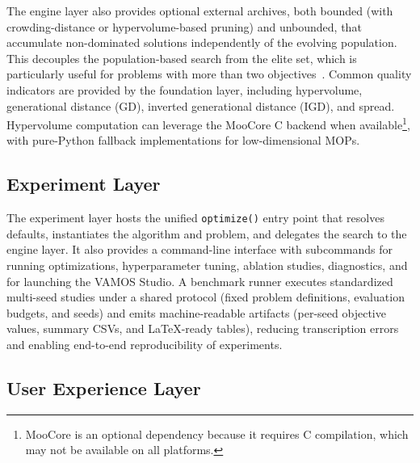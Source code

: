 \documentclass[journal]{IEEEtran}
\begin{document}
The engine layer also provides optional external archives, both bounded (with crowding-distance or hypervolume-based pruning) and unbounded, that accumulate non-dominated solutions independently of the evolving population. This decouples the population-based search from the elite set, which is particularly useful for problems with more than two objectives~\cite{IPS20}. Common quality indicators are provided by the foundation layer, including hypervolume, generational distance (GD), inverted generational distance (IGD), and spread. Hypervolume computation can leverage the MooCore C backend when available\footnote{MooCore is an optional dependency because it requires C compilation, which may not be available on all platforms.}, with pure-Python fallback implementations for low-dimensional MOPs.

\subsection{Experiment Layer}

The experiment layer hosts the unified \texttt{optimize()} entry point that resolves defaults, instantiates the algorithm and problem, and delegates the search to the engine layer. It also provides a command-line interface with subcommands for running optimizations, hyperparameter tuning, ablation studies, diagnostics, and for launching the VAMOS Studio. A benchmark runner executes standardized multi-seed studies under a shared protocol (fixed problem definitions, evaluation budgets, and seeds) and emits machine-readable artifacts (per-seed objective values, summary CSVs, and LaTeX-ready tables), reducing transcription errors and enabling end-to-end reproducibility of experiments.

\subsection{User Experience Layer}
\end{document}
